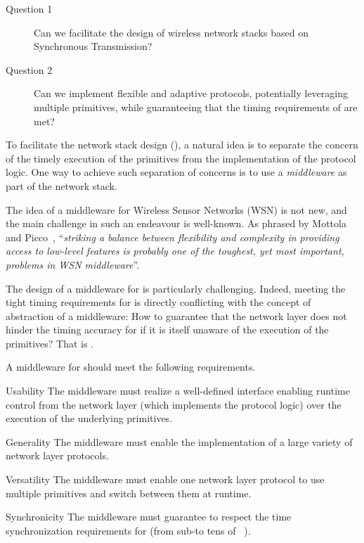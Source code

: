 \begin{research_questions}
  \begin{description}
    \item[Question 1]
    Can we facilitate the design of wireless network stacks based on Synchronous Transmission?

    \item[Question 2]
    Can we implement flexible and adaptive protocols, potentially leveraging multiple \ST primitives, while guaranteeing that the timing requirements of \ST are met?
  \end{description}
\end{research_questions}

To facilitate the network stack design (),
a natural idea is to separate the concern of the timely execution of the primitives from the implementation of the protocol logic.
One way to achieve such separation of concerns is to use a \textsl{middleware} as part of the network stack.

The idea of a middleware for Wireless Sensor Networks (WSN) is not new, and the main challenge in such an endeavour is well-known.
As phrased by Mottola and Picco~\cite{mottola2012Middleware}, ``\textit{striking a balance between flexibility and complexity in providing access to low-level features is probably one of the toughest, yet most important, problems in WSN middleware}''.

The design of a middleware for \ST is particularly challenging.
Indeed, meeting the tight timing requirements for \ST is directly conflicting with the concept of abstraction of a middleware: How to guarantee that the network layer does not hinder the timing accuracy for \ST if it is itself unaware of the execution of the primitives? That is .


 A middleware for \ST should meet the following requirements.

\begin{features}

	\item[Usability]
	The middleware must realize a well-defined interface enabling runtime control from the network layer (which implements the protocol logic) over the execution of the underlying \ST primitives.

	\item[Generality]
	The middleware must enable the implementation of a large variety of network layer protocols.

	\item[Versatility]
	The middleware must enable one network layer protocol to use multiple \ST primitives and switch between them at runtime.

	\item[Synchronicity]
	The middleware must guarantee to respect the time synchronization requirements for \ST (from sub-\us to tens of \us~\cite{yuan2013LetTalkTogether}).
\end{features}

